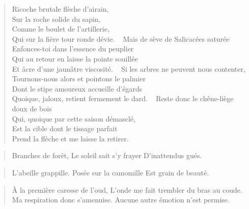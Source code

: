 \begin{verse}
Ricoche brutale flèche d’airain,\\
Sur la roche solide du sapin,\\
Comme le boulet de l’artillerie,\\
Qui sur la fière tour  ronde dévie.\label{foot.tourRonde}
~
Mais de sève de Salicacées saturée\\
Enfonces-toi dans l’essence du peuplier\\
Qui au retour en laisse la pointe souillée\\
Et âcre d’une jaunâtre viscosité.
~
Si les arbres ne peuvent nous contenter,\\
Tournons-nous alors et pointons le palmier\\
Dont le stipe amoureux accueille d’égards\\
Quoique, jaloux, retient fermement le dard.
~
Reste donc le chêne-liège doux de bois\\
Qui, quoique par cette saison démasclé,\\
Est la  cible dont le tissage parfait\\
Prend la flèche et me laisse la retirer.
\end{verse}

\begin{verse}
Branches de forêt,
Le soleil sait s’y frayer
D’inattendus gués.
\end{verse}

\begin{verse}
L’abeille grappille.
Posée sur la camomille
Est grain de beauté.
\end{verse}

\begin{verse}
À la première caresse de l’oud,
L’onde me fait trembler du bras au coude.
Ma respiration donc s’amenuise.
Aucune autre émotion n’est permise.
\end{verse}

